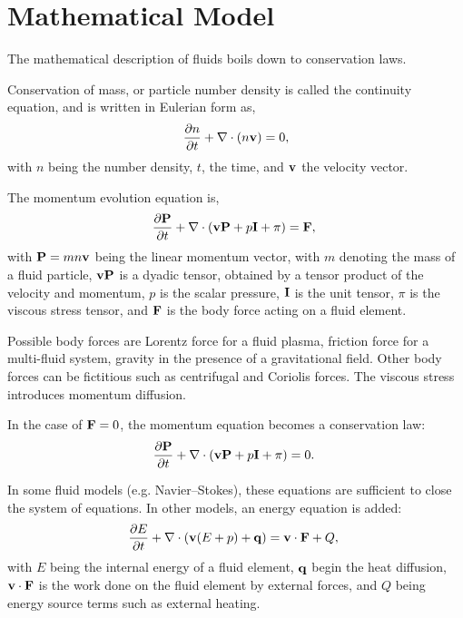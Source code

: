 \section{Mathematical Model}

The mathematical description of fluids boils down to conservation laws. 

Conservation of mass, or particle number density is called the continuity equation, and is written in Eulerian form as,
\begin{gather}
	\frac{\partial n}{\partial t} + \nabla \cdot (n \mathbf{v}) = 0,
\end{gather}
with $n$ being the number density, $t$, the time, and $\mathbf{v}$ the velocity vector.

The momentum evolution equation is,
\begin{gather}
    \frac{\partial \mathbf{P}}{\partial t} + \nabla \cdot\left(\mathbf{v} \mathbf{P} + p \mathbf{I} + \pi\right) =  \mathbf{F},~\label{eq:momentum}
\end{gather}
with $\mathbf{P} = m n \mathbf{v}$ being the linear momentum vector, with $m$ denoting the mass of a fluid particle, $\mathbf{v} \mathbf{P}$ is a dyadic tensor, obtained by a tensor product of the velocity and momentum, $p$ is the scalar pressure, $\mathbf{I}$ is the unit tensor, $\pi$ is the viscous stress tensor, and $\mathbf{F}$ is the body force acting on a fluid element.

Possible body forces are Lorentz force for a fluid plasma, friction force for a multi-fluid system, gravity in the presence of a gravitational field. Other body forces can be fictitious such as centrifugal and Coriolis forces. The viscous stress introduces momentum diffusion.

In the case of $\mathbf{F}=0$, the momentum equation becomes a conservation law:
\begin{gather}
    \frac{\partial \mathbf{P}}{\partial t} + \nabla \cdot\left(\mathbf{v} \mathbf{P} + p \mathbf{I} + \pi\right) =  0.~\label{eq:momentum_conservation}
\end{gather}

In some fluid models (e.g. Navier–Stokes), these equations are sufficient to close the system of equations. In other models, an energy equation is added:
\begin{gather}
    \frac{\partial E}{\partial t} + \nabla \cdot\left(\mathbf{v} (E + p)+\mathbf{q}\right) =  \mathbf{v}\cdot\mathbf{F} + Q,~\label{eq:energy}
\end{gather}
with $E$ being the internal energy of a fluid element, $\mathbf{q}$ begin the heat diffusion, $\mathbf{v}\cdot\mathbf{F}$ is the work done on the fluid element by external forces, and $Q$ being energy source terms such as external heating.

